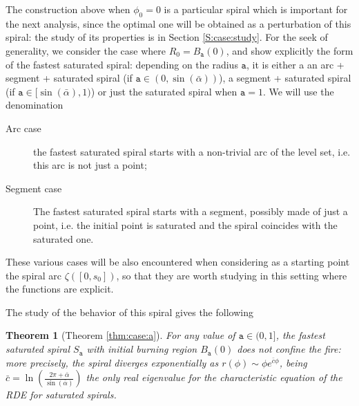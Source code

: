\documentclass[reqno]{amsart}
\theoremstyle{definition} \newtheorem{definition}{Definition}[section]
\theoremstyle{definition} \newtheorem{remark}[definition]{Remark}
\theoremstyle{plain} \newtheorem{lemma}[definition]{Lemma}
\theoremstyle{plain} \newtheorem{proposition}[definition]{Proposition}
\theoremstyle{plain} \newtheorem{theorem}[definition]{Theorem}
\theoremstyle{plain} \newtheorem{corollary}[definition]{Corollary}
\theoremstyle{definition} \newtheorem{example}[definition]{Example}
\theoremstyle{plain} \newtheorem{claim}[clai]{Claim}
\theoremstyle{definition} \newtheorem{assumption}[definition]{Assumption}
\theoremstyle{definition} \newtheorem{observation}[definition]{Observation}
\newcommand{\1}{\mathbbm 1}
\numberwithin{equation}{section} %
\theoremstyle{plain} \newtheorem*{theorem*}{Theorem}
\theoremstyle{plain} \newtheorem{mthm}[maintheorem]{Main Theorem}
\theoremstyle{plain} \newtheorem*{mthm*}{Main Theorem}
\theoremstyle{plain} \newtheorem*{conjecture*}{Conjecture}
\theoremstyle{plain} \newtheorem{conjecture}[definition]{Conjecture}
\theoremstyle{plain} \newtheorem*{problem*}{Problem}
\begin{document}
The construction above when $\phi_0 = 0$ is a particular spiral which is important for the next analysis, since the optimal one will be obtained as a perturbation of this spiral: the study of its properties is in Section \ref{S:case:study}. For the seek of generality, we consider the case where $R_0 = B_{\mathtt a}(0)$, and show explicitly the form of the fastest saturated spiral: depending on the radius $\mathtt a$, it is either a an arc + segment + saturated spiral (if $\mathtt a \in (0,\sin(\bar \alpha))$), a segment + saturated spiral (if $\mathtt a \in [\sin(\bar \alpha),1)$) or just the saturated spiral when $\mathtt a = 1$. We will use the denomination
\begin{description}
\item[Arc case] the fastest saturated spiral starts with a non-trivial arc of the level set, i.e. this arc is not just a point;
\item[Segment case] The fastest saturated spiral starts with a segment, possibly made of just a point, i.e. the initial point is saturated and the spiral coincides with the saturated one.
\end{description}
These various cases will be also encountered when considering as a starting point the spiral arc $\zeta([0,s_0])$, so that they are worth studying in this setting where the functions are explicit.

The study of the behavior of this spiral gives the following

\begin{theorem}[Theorem \ref{thm:case:a}]
\label{thm:case:a_intro}
For any value of $\mathtt a \in (0,1]$, the fastest saturated spiral $S_{\mathtt a}$ with initial burning region $B_\mathtt a(0)$ does not confine the fire: more precisely, the spiral diverges exponentially as $r(\phi) \sim \phi e^{\bar c \phi}$,
being $\bar c = \ln(\frac{2\pi+\bar \alpha}{\sin(\bar \alpha)})$ the only real eigenvalue for the characteristic equation of the RDE for saturated spirals.
\end{theorem}
\end{document}
